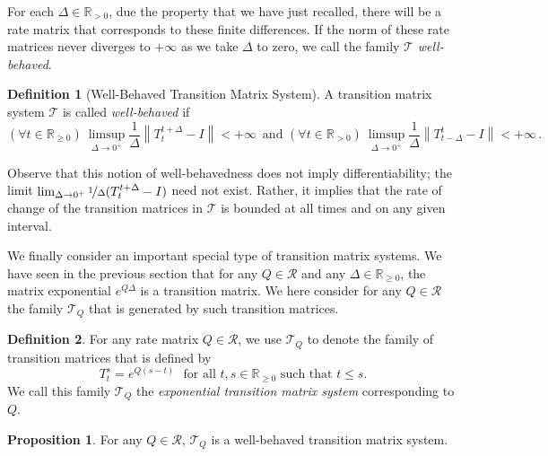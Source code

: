 \documentclass[10pt,a4paper]{paper}
\theoremstyle{definition}
\newtheorem{proposition}[theorem]{Proposition}
\newtheorem{definition}{Definition}
\newcommand{\reals}{\mathbb{R}}
\newcommand{\realspos}{\reals_{>0}}
\newcommand{\realsnonneg}{\reals_{\geq 0}}
\newcommand{\norm}[1]{\left\lVert #1 \right\rVert}
\begin{document}
For each $\Delta\in\realspos$, due the property that we have just recalled, there will be a rate matrix that corresponds to these finite differences. If the norm of these rate matrices never diverges to $+\infty$ as we take $\Delta$ to zero, we call the family $\mathcal{T}$ \emph{well-behaved}.

\begin{definition}[Well-Behaved Transition Matrix System]\label{def:well_behaved_trans_mat_system}
A transition matrix system $\mathcal{T}$ is called \emph{well-behaved} if 
\begin{equation}\label{eq:wellbehavedtransitionmatrixsystem}%
(\forall t\in\realsnonneg)~\limsup_{\Delta\to 0^{+}}\frac{1}{\Delta}\norm{T_{t}^{t+\Delta}-I}<+\infty\,
\text{~and~}
(\forall t\in\realspos)~\limsup_{\Delta\to 0^{+}}\frac{1}{\Delta}\norm{T_{t-\Delta}^t-I}<+\infty\,.
\end{equation}
\end{definition}

Observe that this notion of well-behavedness does not imply differentiability; the limit $\lim_{\Delta\to0^+}\nicefrac{1}{\Delta}(T_t^{t+\Delta}-I)$ need not exist. Rather, it implies that the rate of change of the transition matrices in $\mathcal{T}$ is bounded at all times and on any given interval.

We finally consider an important special type of transition matrix systems. We have seen in the previous section that for any $Q\in\mathcal{R}$ and any $\Delta\in\realsnonneg$, the matrix exponential $e^{Q\Delta}$ is a transition matrix. We here consider for any $Q\in\mathcal{R}$ the family $\mathcal{T}_Q$ that is generated by such transition matrices.
\begin{definition}\label{def:systemfromQ}For any rate matrix $Q\in\mathcal{R}$, we use $\mathcal{T}_Q$ to denote the family of transition matrices that is defined by
\begin{equation*}
T_t^s=e^{Q(s-t)}
\text{~~for all $t,s\in\realsnonneg$ such that $t\leq s$.}
\end{equation*}
We call this family $\mathcal{T}_Q$ the \emph{exponential transition matrix system} corresponding to $Q$.
\end{definition}


\begin{proposition}
\label{prop:systemQ}
For any $Q\in\mathcal{R}$, $\mathcal{T}_Q$ is a well-behaved transition matrix system.
\end{proposition}
\end{document}
